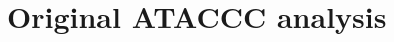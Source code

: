 \documentclass[thesis.tex]{subfiles}
\begin{document}
\chapter{Original ATACCC analysis} \label{ATACCC:sec:original-analysis}
\end{document}
